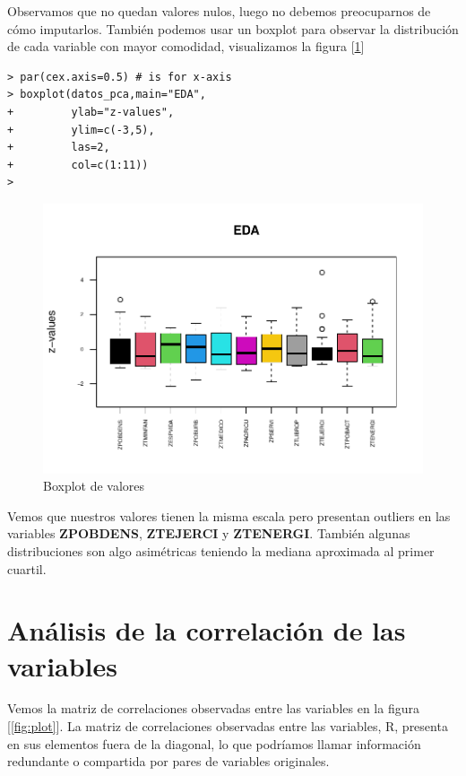 \documentclass[12pt,twoside]{report}
\begin{document}
Observamos que no quedan valores nulos, luego no debemos preocuparnos de cómo imputarlos.
También podemos usar un boxplot para observar la distribución de cada variable con mayor comodidad, visualizamos la figura [\ref{fig:boxplot}]

 \begin{lstlisting}
> par(cex.axis=0.5) # is for x-axis
> boxplot(datos_pca,main="EDA",
+         ylab="z-values",
+         ylim=c(-3,5),
+         las=2,
+         col=c(1:11))
> 
\end{lstlisting}

\begin{figure}[H]
\includegraphics[width=\textwidth]{../code/figures/boxplot.pdf}
\caption{Boxplot de valores}
\label{fig:boxplot}
\end{figure} 

Vemos que nuestros valores tienen la misma escala pero presentan outliers en las variables \textbf{ZPOBDENS}, \textbf{ZTEJERCI} y  \textbf{ZTENERGI}. También algunas distribuciones son algo asimétricas teniendo la mediana aproximada al primer cuartil.

\section*{Análisis de la correlación de las variables}

Vemos la matriz de correlaciones observadas entre las variables en la figura [\ref{fig:plot}]. La matriz de correlaciones observadas entre las variables, R, presenta en sus elementos fuera de la diagonal, lo que podríamos llamar información redundante o compartida por pares de variables originales.
\end{document}
